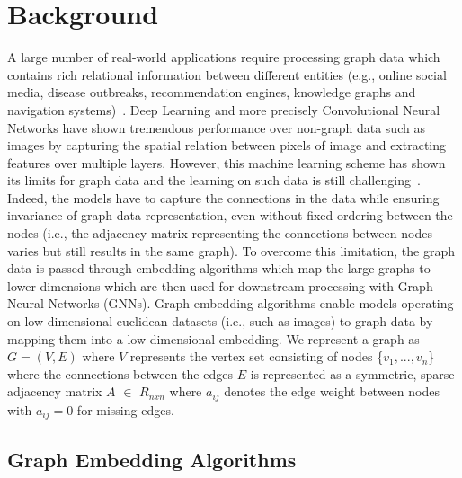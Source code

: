 \section{Background}\label{background}

A large number of real-world applications require processing graph data which contains rich relational information between different entities (e.g., online social media, disease outbreaks, recommendation engines, knowledge graphs and navigation systems)~\cite{zhou2018graph}.
Deep Learning and more precisely Convolutional Neural Networks have shown tremendous performance over non-graph data such as images by capturing the spatial relation between pixels of image and extracting features over multiple layers.
However, this machine learning scheme has shown its limits for graph data and the learning on such data is still challenging~\cite{zhou2018graph}.
Indeed, the models have to capture the connections in the data while ensuring invariance of graph data representation, even without fixed ordering between the nodes (i.e., the adjacency matrix representing the connections between nodes varies but still results in the same graph). %
To overcome this limitation, the graph data is passed through embedding algorithms which map the large graphs to lower dimensions which are then used for downstream processing with Graph Neural Networks (GNNs).
Graph embedding algorithms enable models operating on low dimensional euclidean datasets (i.e., such as images) to graph data by mapping them into a low dimensional embedding.
We represent a graph as $G=(V,E)$ where $V$ represents the vertex set consisting of nodes \{$v_1,...,v_n$\} where the connections between the edges $E$ is represented as a symmetric, sparse adjacency matrix $A$ $\in$ $R_{nxn}$ where $a_{ij}$ denotes the edge weight between nodes with $a_{ij}= 0$ for missing edges.


\subsection{Graph Embedding Algorithms}

